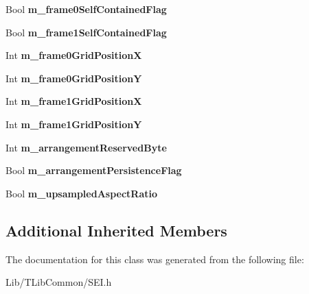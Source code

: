 \begin{DoxyCompactItemize}
Bool {\bfseries m\+\_\+frame0\+Self\+Contained\+Flag}
\item 
\mbox{\label{class_s_e_i_frame_packing_a452842318b90b7603d2422bf01ef03ee}} 
Bool {\bfseries m\+\_\+frame1\+Self\+Contained\+Flag}
\item 
\mbox{\label{class_s_e_i_frame_packing_a3e71eafd91f446c86de670796170ba81}} 
Int {\bfseries m\+\_\+frame0\+Grid\+PositionX}
\item 
\mbox{\label{class_s_e_i_frame_packing_ad43e0ede764e4571dc198b05ff1042a2}} 
Int {\bfseries m\+\_\+frame0\+Grid\+PositionY}
\item 
\mbox{\label{class_s_e_i_frame_packing_a0d586e33e61e87afb10b3ff353b48537}} 
Int {\bfseries m\+\_\+frame1\+Grid\+PositionX}
\item 
\mbox{\label{class_s_e_i_frame_packing_ab8d544c17a0287db3259bc4952f06aa7}} 
Int {\bfseries m\+\_\+frame1\+Grid\+PositionY}
\item 
\mbox{\label{class_s_e_i_frame_packing_a92310f0fdc55bf11a54e61a66c3b9365}} 
Int {\bfseries m\+\_\+arrangement\+Reserved\+Byte}
\item 
\mbox{\label{class_s_e_i_frame_packing_a70c8cb53b8a24ea5227866dcfc8c84cb}} 
Bool {\bfseries m\+\_\+arrangement\+Persistence\+Flag}
\item 
\mbox{\label{class_s_e_i_frame_packing_ad1acd5b9bc784984b77bd3acceb28234}} 
Bool {\bfseries m\+\_\+upsampled\+Aspect\+Ratio}
\end{DoxyCompactItemize}
\subsection*{Additional Inherited Members}


The documentation for this class was generated from the following file\+:\begin{DoxyCompactItemize}
\item 
Lib/\+T\+Lib\+Common/S\+E\+I.\+h\end{DoxyCompactItemize}
